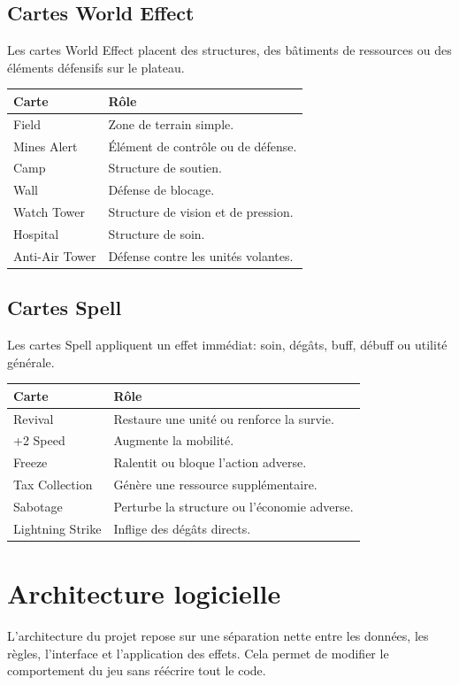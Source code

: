 \documentclass[12pt,a4paper]{article}
\begin{document}
\subsection{Cartes World Effect}
Les cartes World Effect placent des structures, des bâtiments de ressources ou des éléments défensifs sur le plateau.

\begin{longtable}{p{} p{}}
\toprule
\textbf{Carte} & \textbf{Rôle} \\
\midrule
Field & Zone de terrain simple. \\
Mines Alert & Élément de contrôle ou de défense. \\
Camp & Structure de soutien. \\
Wall & Défense de blocage. \\
Watch Tower & Structure de vision et de pression. \\
Hospital & Structure de soin. \\
Anti-Air Tower & Défense contre les unités volantes. \\
\bottomrule
\end{longtable}

\subsection{Cartes Spell}
Les cartes Spell appliquent un effet immédiat: soin, dégâts, buff, débuff ou utilité générale.

\begin{longtable}{p{} p{}}
\toprule
\textbf{Carte} & \textbf{Rôle} \\
\midrule
Revival & Restaure une unité ou renforce la survie. \\
+2 Speed & Augmente la mobilité. \\
Freeze & Ralentit ou bloque l'action adverse. \\
Tax Collection & Génère une ressource supplémentaire. \\
Sabotage & Perturbe la structure ou l'économie adverse. \\
Lightning Strike & Inflige des dégâts directs. \\
\bottomrule
\end{longtable}

\section{Architecture logicielle}
L'architecture du projet repose sur une séparation nette entre les données, les règles, l'interface et l'application des effets. Cela permet de modifier le comportement du jeu sans réécrire tout le code.
\end{document}
